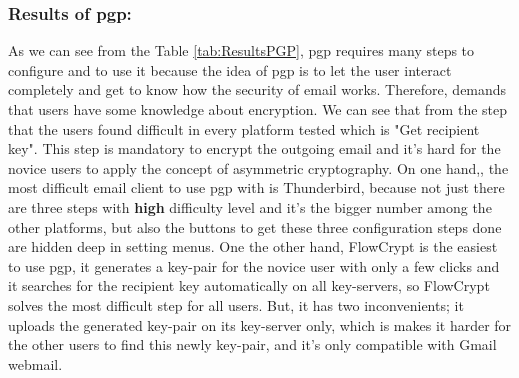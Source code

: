\subsubsection{Results of \acrshort{pgp}:}
As we can see from the Table \ref{tab:ResultsPGP}, \acrshort{pgp} requires many steps to configure and to use it because the idea of \acrshort{pgp} is to let the user interact completely and get to know how the security of email works. Therefore, demands that users have some knowledge about encryption. We can see that from the step that the users found difficult in every platform tested which is "Get recipient key". This step is mandatory to encrypt the outgoing email and it’s hard for the novice users to apply the concept of asymmetric cryptography. On one hand,, the most difficult email client to use \acrshort{pgp} with is Thunderbird, because not just there are three steps with \textbf{high} difficulty level and it's the bigger number among the other platforms, but also the buttons to get these three configuration steps done are hidden deep in setting menus. One the other hand, FlowCrypt is the easiest to use \acrshort{pgp}, it generates a key-pair for the novice user with only a few clicks and it searches for the recipient key automatically on all key-servers, so FlowCrypt solves the most difficult step for all users. But, it has two inconvenients; it uploads the generated key-pair on its key-server only, which is makes it harder for the other users to find this newly key-pair, and it's only compatible with Gmail webmail.
